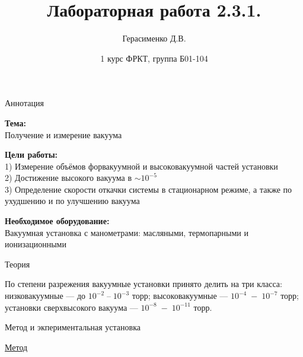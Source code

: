 \documentclass{article}
\title{
    \textbf{Лабораторная работа 2.3.1.}
}
\author{Герасименко Д.В.}
\date{1 курс ФРКТ, группа Б01-104}
\begin{document}
\maketitle

\begin{center}
    \raggedleft
    {
        \LARGE {Аннотация}
    }
    \hline
    \hline
\end{center}

\begin{center}
    \raggedright
    {
        \Large{\textbf{Тема:}}
        \\
    }
    \large {Получение и измерение вакуума}
\end{center}

\begin{center}
    \raggedright
    {
        \large{\textbf{Цели работы:}}
        \\
    }
    \large {1) Измерение объёмов форвакуумной и высоковакуумной частей установки}
    \\
    \large {2) Достижение высокого вакуума в \(\sim 10^{-5}\)}
    \\
    \large {3) Определение скорости откачки системы в стационарном режиме, а также по ухудшению и по улучшению вакуума}
\end{center}

\begin{center}
    \raggedright
    {
        \large{\textbf{Необходимое оборудование:}}
        \\
    }
    \large {Вакуумная установка с манометрами: масляными, термопарными и ионизационными}
\end{center}

\begin{center}
    \raggedleft
    {
        \LARGE {Теория}
    }
    \hline
    \hline
\end{center}

По степени разрежения вакуумные установки принято делить на три класса: низковакуумные — до \(10^{-2}\;–\;10^{−3}\) торр; высоковакуумные — \(10^{-4}\;-\;10^{-7}\) торр; установки сверхвысокого вакуума — \(10^{-8}\;-\;10^{-11}\) торр.

\begin{center}
    \raggedleft
    {
        \LARGE {Метод и экпериментальная установка}
    }
    \hline
    \hline
\end{center}

\begin{center}
    \raggedleft
    {
        \large{\underline{Метод}}
    }
\end{center}
\end{document}
